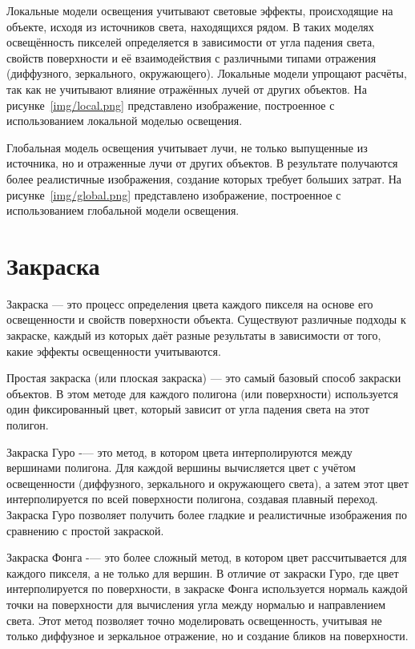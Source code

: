 Локальные модели освещения учитывают световые эффекты, происходящие на объекте, исходя из источников света, находящихся рядом. В таких моделях освещённость пикселей определяется в зависимости от угла падения света, свойств поверхности и её взаимодействия с различными типами отражения (диффузного, зеркального, окружающего). Локальные модели упрощают расчёты, так как не учитывают влияние отражённых лучей от других объектов. На рисунке~\ref{img/local.png} представлено изображение, построенное с использованием локальной моделью освещения.


Глобальная модель освещения учитывает лучи, не только выпущенные из источника, но и отраженные лучи от других объектов. В результате получаются более реалистичные изображения, создание которых требует больших затрат. На рисунке~\ref{img/global.png} представлено изображение, построенное с использованием глобальной модели освещения.


\section{Закраска} Закраска — это процесс определения цвета каждого пикселя на основе его освещенности и свойств поверхности объекта. Существуют различные подходы к закраске, каждый из которых даёт разные результаты в зависимости от того, какие эффекты освещенности учитываются.

Простая закраска (или плоская закраска) — это самый базовый способ закраски объектов. В этом методе для каждого полигона (или поверхности) используется один фиксированный цвет, который зависит от угла падения света на этот полигон.

Закраска Гуро -— это метод, в котором цвета интерполируются между вершинами полигона. Для каждой вершины вычисляется цвет с учётом освещенности (диффузного, зеркального и окружающего света), а затем этот цвет интерполируется по всей поверхности полигона, создавая плавный переход. Закраска Гуро позволяет получить более гладкие и реалистичные изображения по сравнению с простой закраской.

Закраска Фонга -— это более сложный метод, в котором цвет рассчитывается для каждого пикселя, а не только для вершин. В отличие от закраски Гуро, где цвет интерполируется по поверхности, в закраске Фонга используется нормаль каждой точки на поверхности для вычисления угла между нормалью и направлением света. Этот метод позволяет точно моделировать освещенность, учитывая не только диффузное и зеркальное отражение, но и создание бликов на поверхности.


